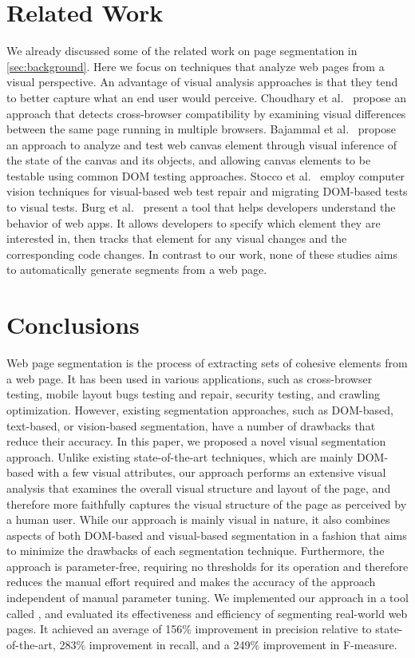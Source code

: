 \section{Related Work}
We already discussed some of the related work on page segmentation in \autoref{sec:background}.
Here we focus on techniques that
analyze web pages from a visual perspective.
An advantage of visual analysis approaches is that
they tend to better capture what an end user would perceive.
Choudhary et al.~\cite{choudhary2012crosscheck} propose
an approach that detects cross-browser compatibility
by examining visual differences between the same page running in multiple browsers.
Bajammal et al.~\cite{canvas_icst2018} propose an approach
to analyze and test web canvas element through visual
inference of the state of the canvas and its objects,
and allowing canvas elements to be testable using common DOM testing approaches.
Stocco et al.~\cite{2018-Stocco-FSE} employ computer vision techniques
 for visual-based web test repair and migrating DOM-based tests to visual tests.
Burg et al.~\cite{burg2015explaining} present a tool that helps
developers understand the behavior of web apps.
It allows developers to specify which element they are interested in,
then tracks that element for any visual changes and the corresponding code changes.
In contrast to our work,
none of these studies aims to automatically generate segments from a web page.


\section{Conclusions}

Web page segmentation is the process of extracting
sets of cohesive elements from a web page.
It has been used in various applications,
such as cross-browser testing,
mobile layout bugs testing and repair,
security testing, and crawling optimization.
However, existing segmentation approaches,
such as DOM-based, text-based, or vision-based segmentation,
have a number of drawbacks that reduce their accuracy.
In this paper, we proposed a novel visual segmentation approach.
Unlike existing state-of-the-art techniques,
which are mainly DOM-based with a few visual attributes,
our approach performs an extensive visual analysis that examines
the overall visual structure and layout of the page, 
and therefore more faithfully captures the visual structure of the page as perceived by a human user. 
While our approach is mainly visual in nature,
it also combines aspects of both DOM-based and visual-based segmentation
in a fashion that aims to minimize the drawbacks of each segmentation technique.
Furthermore, the approach is parameter-free,
requiring no thresholds for its operation and therefore
reduces the manual effort required and
makes the accuracy of the approach
independent of manual parameter tuning. 
We implemented our approach in a tool called \toolname,
and evaluated its effectiveness and efficiency of
segmenting real-world web pages. 
It achieved an average of 156\% improvement in precision
relative to state-of-the-art, 283\% improvement in recall, 
and a 249\% improvement in F-measure.

